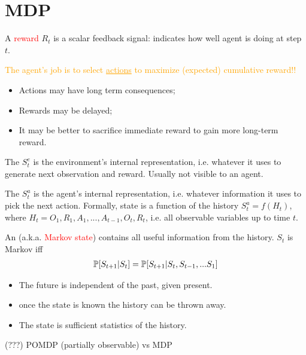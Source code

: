 \section{MDP}

A \textcolor{red}{reward} $R_t$ is a scalar feedback signal: indicates how well agent is doing at step $t$.

\textcolor{orange}{The agent’s job is to select \underline{actions} to maximize (expected) cumulative reward!!}
\begin{itemize}
	\item Actions may have long term consequences;
	\item Rewards may be delayed;
	\item It may be better to sacrifice immediate reward to gain more long-term reward.
\end{itemize}

The  $S^e_t$ is the environment's internal representation, i.e. whatever it uses to generate next observation and reward. Usually not visible to an agent.

The  $S^a_t$ is the agent's internal representation, i.e. whatever information it uses to pick the next action. Formally, state is a function of the history $S^a_t = f(H_t)$, where $H_t = O_1, R_1, A_1, ..., A_{t-1}, O_{t}, R_{t}$, i.e. all observable variables up to time $t$.

An  (a.k.a. \textcolor{red}{Markov state}) contains all useful information from the history. $S_t$ is Markov iff
\begin{align*}
\mathbb{P} [S_{t+1}|S_t]	= \mathbb{P}[S_{t+1}| S_t, S_{t-1}, ... S_1]
\end{align*}
\begin{itemize}
	\item The future is independent of the past, given present.
	\item once the state is known the history can be thrown away.
	\item The state is sufficient statistics of the history.
\end{itemize}


(???) POMDP (partially observable) vs MDP




